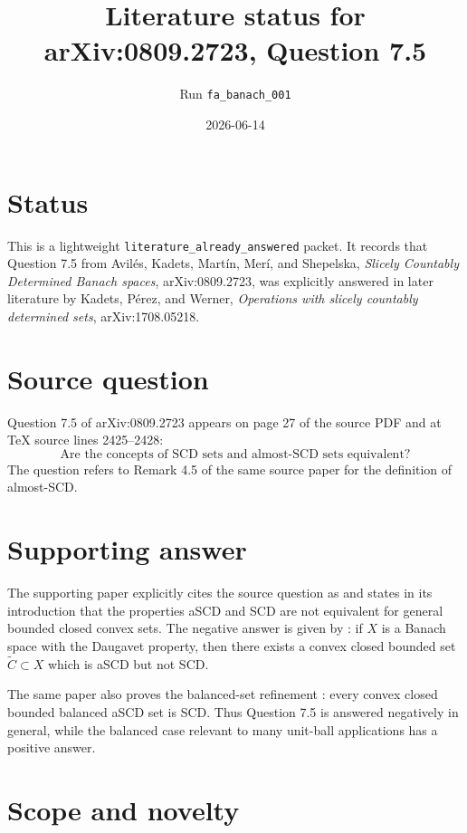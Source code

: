 \documentclass[11pt]{article}
\title{Literature status for arXiv:0809.2723, Question 7.5}
\author{Run \texttt{fa\_banach\_001}}
\date{2026-06-14}
\begin{document}
\maketitle

\section*{Status}

This is a lightweight \texttt{literature\_already\_answered} packet. It records
that Question 7.5 from Avilés, Kadets, Martín, Merí, and Shepelska,
\emph{Slicely Countably Determined Banach spaces}, arXiv:0809.2723, was
explicitly answered in later literature by Kadets, Pérez, and Werner,
\emph{Operations with slicely countably determined sets}, arXiv:1708.05218.

\section*{Source question}

Question 7.5 of arXiv:0809.2723 appears on page 27 of the source PDF and at
TeX source lines 2425--2428:
\[
\text{Are the concepts of SCD sets and almost-SCD sets equivalent?}
\]
The question refers to Remark 4.5 of the same source paper for the definition
of almost-SCD.

\section*{Supporting answer}

The supporting paper explicitly cites the source question as
\cite[Question 7.5]{KPW} and states in its introduction that the properties
aSCD and SCD are not equivalent for general bounded closed convex sets. The
negative answer is given by \cite[Theorem 4.3]{KPW}: if \(X\) is a Banach
space with the Daugavet property, then there exists a convex closed bounded
set \(\widetilde C\subset X\) which is aSCD but not SCD.

The same paper also proves the balanced-set refinement
\cite[Theorem 4.5]{KPW}: every convex closed bounded balanced aSCD set is
SCD. Thus Question 7.5 is answered negatively in general, while the balanced
case relevant to many unit-ball applications has a positive answer.

\section*{Scope and novelty}
\end{document}
